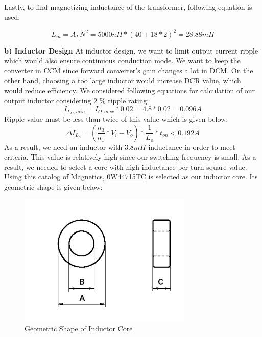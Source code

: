 \documentclass{article}
\newcommand\tab[1][1cm]{\hspace*{#1}}
\begin{document}
\tab Lastly, to find magnetizing inductance of the transformer, following equation is used:

\begin{equation*}
    L_m=A_L N^2=5000 nH*(40+18*2)^2=28.88 mH
\end{equation*}

\tab\textbf{b) Inductor Design}
\newline \tab At inductor design, we want to limit output current ripple which would also ensure continuous conduction mode. We want to keep the converter in CCM since forward converter's gain changes a lot in DCM. On the other hand, choosing a too large inductor would increase DCR value, which would reduce efficiency. We considered following equations for calculation of our output inductor considering 2 \% ripple rating:
\begin{equation*}
    I_{L_O,min}=I_{O,max}*0.02 =4.8*0.02=0.096 A
\end{equation*}
Ripple value must be less than twice of this value which is given below:
\begin{equation*}
{\displaystyle \Delta }I_{L_o}=(\frac{n_3}{n_1}*V_i-V_o)*\frac{1}{L_o}*t_{on}<0.192 A
\end{equation*}
\tab As a result, we need an inductor with $3.8 mH$ inductance in order to meet criteria. This value is relatively high since our switching frequency is small. As a result, we needed to select a core with high inductance per turn square value. Using \href{https://www.mag-inc.com/getattachment/Products/Ferrite-Cores/Learn-More-about-Ferrite-Cores/Magnetics-Ferrite-Catalog-2017.pdf?lang=en-US}{this} catalog of Magnetics, \href{https://www.mag-inc.com/Media/Magnetics/Datasheets/0W44715TC.pdf}{0W44715TC} is selected as our inductor core. Its geometric shape is given below:
\begin{figure}[H]
    \centering
    \includegraphics[scale=0.4]{inductor.PNG}
    \caption{Geometric Shape of Inductor Core}
    \label{fig:my_label}
\end{figure}
\end{document}

